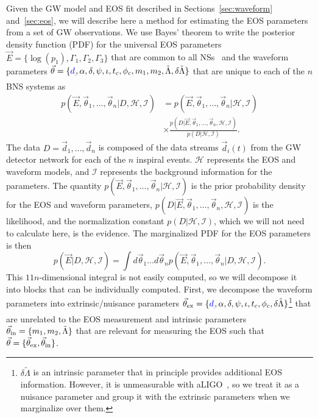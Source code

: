 \documentclass[twocolumn,prd,amssymb,aps,nofootinbib,showpacs,epsf]{revtex4}
\newcommand\les[2]{\textcolor{blue}{{#1}\sout{#2}}}
\begin{document}
Given the GW model and EOS fit described in Sections~\ref{sec:waveform} and~\ref{sec:eos}, we will describe here a method for estimating the EOS parameters from a set of GW observations. We use Bayes' theorem to write the posterior density function (PDF) for the universal EOS parameters $\vec E = \{\log(p_1), \Gamma_1, \Gamma_2, \Gamma_3\}$ that are common to all NSs~\cite{Glendenning1996book} and the waveform parameters $\vec\theta = \{\les{d}{}, \alpha, \delta, \psi, \iota, t_c, \phi_c, m_1, m_2, \tilde\Lambda, \delta\tilde\Lambda\}$ that are unique to each of the $n$ BNS systems as
\begin{equation}
\begin{split}
p(\vec E,\vec\theta_1,\dots,\vec\theta_n | D,\mathcal{H},\mathcal{I})
&= p(\vec E,\vec\theta_1,\dots,\vec\theta_n | \mathcal{H},\mathcal{I}) \\
& \times\frac{ p(D | \vec E,\vec\theta_1,\dots,\vec\theta_n,\mathcal{H},\mathcal{I}) }{ p(D | \mathcal{H},\mathcal{I}) }.
\end{split}
\end{equation}
The data $D = \vec d_1,\dots, \vec d_n$ is composed of the data streams $\vec d_i(t)$ from the GW detector network for each of the $n$ inspiral events. $\mathcal{H}$ represents the EOS and waveform models, and $\mathcal{I}$ represents the background information for the parameters. The quantity $p(\vec E,\vec\theta_1,\dots,\vec\theta_n | \mathcal{H},\mathcal{I})$ is the prior probability density for the EOS and waveform parameters, $p(D | \vec E,\vec\theta_1,\dots,\vec\theta_n,\mathcal{H},\mathcal{I})$ is the likelihood, and the normalization constant $p(D | \mathcal{H},\mathcal{I})$, which we will not need to calculate here, is the evidence. The marginalized PDF for the EOS parameters is then
\begin{equation}
\label{eq:margEOS}
p(\vec E | D,\mathcal{H},\mathcal{I}) = \int d\vec\theta_1 \dots d\vec\theta_n p(\vec E,\vec\theta_1,\dots,\vec\theta_n | D,\mathcal{H},\mathcal{I}).
\end{equation}
This $11n$-dimensional integral is not easily computed, so we will decompose it into blocks that can be individually computed. First, we decompose the waveform parameters into extrinsic/nuisance parameters $\vec\theta_{\rm ex} = \{\les{d}{}, \alpha, \delta, \psi, \iota, t_c, \phi_c, \delta\tilde\Lambda\}$\footnote{$\delta\tilde\Lambda$ is an intrinsic parameter that in principle provides additional EOS information. However, it is unmeasurable with aLIGO~\cite{WadeCreightonOchsner2014}, so we treat it as a nuisance parameter and group it with the extrinsic parameters when we marginalize over them.} that are unrelated to the EOS measurement and intrinsic parameters $\vec\theta_{\rm in} = \{m_1, m_2, \tilde\Lambda\}$ that are relevant for measuring the EOS such that $\vec\theta = \{\vec\theta_{\rm ex}, \vec\theta_{\rm in}\}$.
\end{document}
